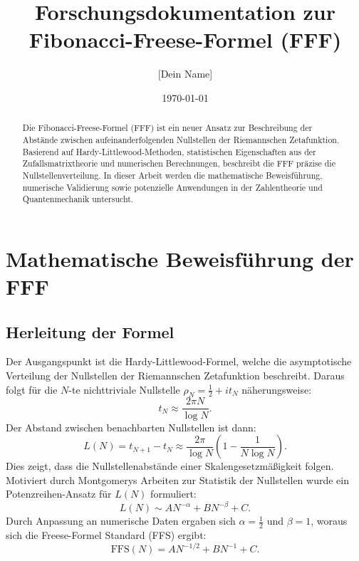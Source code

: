 \documentclass[a4paper,12pt]{article}
\title{\textbf{Forschungsdokumentation zur Fibonacci-Freese-Formel (FFF)}}
\author{[Dein Name]}
\date{\today}
\begin{document}
\maketitle

\begin{abstract}
Die Fibonacci-Freese-Formel (FFF) ist ein neuer Ansatz zur Beschreibung der Abstände zwischen aufeinanderfolgenden Nullstellen der Riemannschen Zetafunktion. Basierend auf Hardy-Littlewood-Methoden, statistischen Eigenschaften aus der Zufallsmatrixtheorie und numerischen Berechnungen, beschreibt die FFF präzise die Nullstellenverteilung. In dieser Arbeit werden die mathematische Beweisführung, numerische Validierung sowie potenzielle Anwendungen in der Zahlentheorie und Quantenmechanik untersucht. 
\end{abstract}

\section{Mathematische Beweisführung der FFF}
\subsection{Herleitung der Formel}
Der Ausgangspunkt ist die Hardy-Littlewood-Formel, welche die asymptotische Verteilung der Nullstellen der Riemannschen Zetafunktion beschreibt. Daraus folgt für die $N$-te nichttriviale Nullstelle $\rho_N = \tfrac{1}{2} + i t_N$ näherungsweise:
\begin{equation}
    t_N \approx \frac{2\pi N}{\log N}.
\end{equation}
Der Abstand zwischen benachbarten Nullstellen ist dann:
\begin{equation}
    L(N) = t_{N+1} - t_N \approx \frac{2\pi}{\log N}\left(1 - \frac{1}{N\log N}\right).
\end{equation}
Dies zeigt, dass die Nullstellenabstände einer Skalengesetzmäßigkeit folgen. Motiviert durch Montgomerys Arbeiten zur Statistik der Nullstellen wurde ein Potenzreihen-Ansatz für $L(N)$ formuliert:
\begin{equation}
    L(N) \sim A N^{-\alpha} + B N^{-\beta} + C.
\end{equation}
Durch Anpassung an numerische Daten ergaben sich $\alpha = \tfrac{1}{2}$ und $\beta = 1$, woraus sich die Freese-Formel Standard (FFS) ergibt:
\begin{equation}
    \text{FFS}(N) = A N^{-1/2} + B N^{-1} + C.
\end{equation}
\end{document}
